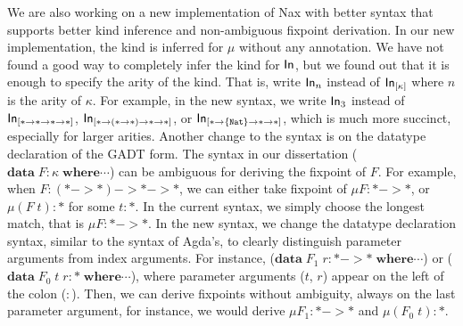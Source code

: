 We are also working on a new implementation of Nax with better syntax
that supports better kind inference and non-ambiguous fixpoint derivation.
In our new implementation, the kind is inferred for $\mu$ without
any annotation. We have not found a good way to completely infer the kind
for $\mathsf{In}$, but we found out that it is enough to specify the arity of the kind.
That is, write $\mathsf{In}_n$ instead of $\mathsf{In}_{[\kappa]}$ where $n$ is the arity of
$\kappa$. For example, in the new syntax, we write $\mathsf{In}_3$ instead of
$\mathsf{In}_{[* -> * -> * -> *]}$, $\mathsf{In}_{[* -> (* -> *) -> * -> *]}$, or
$\mathsf{In}_{[* -> \{\texttt{Nat}\} -> * -> *]}$, which is much more succinct,
especially for larger arities. Another change to the syntax is on
the datatype declaration of the GADT form. The syntax in our dissertation
($\mathbf{data}\;F : \kappa\;\mathbf{where} \cdots$) can be ambiguous
for deriving the fixpoint of $F$. For example, when $F : (* -> *) -> * -> *$,
we can either take fixpoint of $\mu F : * -> *$, or $\mu (F\;t) : *$
for some $t : *$. In the current syntax, we simply choose the longest match,
that is $\mu F : * -> *$. In the new syntax, we change the datatype declaration
syntax, similar to the syntax of Agda's, to clearly distinguish
parameter arguments from index arguments.
For instance,
($\mathbf{data}\;F_1\;r: * -> * \;\mathbf{where} \cdots$) or
($\mathbf{data}\;F_0\;t\;r: * \;\mathbf{where} \cdots$), where
parameter arguments ($t$, $r$) appear on the left of the colon ($:$).
Then, we can derive fixpoints without ambiguity, always on the last
parameter argument, for instance, we would derive $\mu F_1 : * -> *$
and $\mu(F_0\;t): *$.

